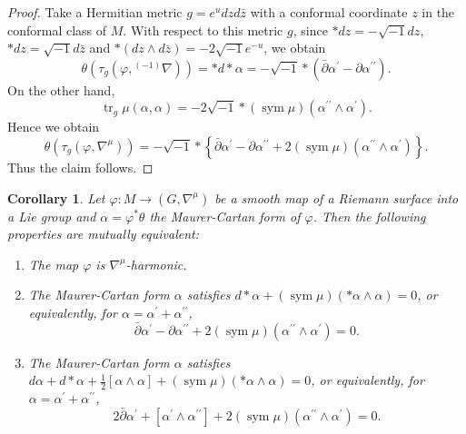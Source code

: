 \documentclass[12pt]{amsart}
\newtheorem{Corollary}[Theorem]{Corollary}
\theoremstyle{definition}
\theoremstyle{remark}
\numberwithin{equation}{section}
\begin{document}
\begin{proof}

 Take a Hermitian metric $g = e^u dz d \bar z$ with 
 a conformal coordinate $z$ in the 
 conformal class of $M$. With respect to this metric $g$, 
 since $* dz = - \sqrt{-1} dz$, $* dz = \sqrt{-1} d\bar z$ 
 and $*(d z \wedge d \bar z) = - 2 \sqrt{-1} e^{-u}$, we obtain
\begin{equation*}
\theta(\tau_{g} (\varphi,{{}^{(-1)}\nabla}))
= * d * \alpha=
-\sqrt{-1}* (\bar{\partial}\alpha^{\prime}
-\partial \alpha^{\prime\prime}).
\end{equation*}
 On the other hand, 
\begin{equation*}
{\operatorname {tr}_g} \mu(\alpha,\alpha)
=- 2\sqrt{-1}* ({\operatorname {sym}} \mu)(\alpha^{\prime \prime}
\wedge \alpha^{\prime}).
\end{equation*}
Hence we obtain
\begin{equation*}
\theta(\tau_g(\varphi,{\nabla^{\mu}}))
= -
\sqrt{-1}*
\left\{
\bar{\partial}\alpha^{\prime}-
\partial\alpha^{\prime\prime}
+2({\operatorname {sym}} \mu)(\alpha^{\prime \prime}
\wedge \alpha^{\prime})
\right\}.
\end{equation*}
Thus the claim follows.

\end{proof}

\begin{Corollary}\label{coro:affharmonic}
 Let $\varphi:M \to (G,{\nabla^{\mu}})$ be a 
 smooth map of a Riemann surface into 
 a Lie group and $\alpha = \varphi^{*}\theta$ 
 the Maurer-Cartan form of $\varphi$. 
 Then the following properties are mutually equivalent:
\begin{enumerate}
\item The map $\varphi$ is ${\nabla^{\mu}}$-harmonic.
\item The Maurer-Cartan form $\alpha$ satisfies
$ d * \alpha +({\operatorname {sym}} \mu)(*\alpha \wedge \alpha)=0$, 
or equivalently, for $\alpha =\alpha^{\prime} + \alpha^{\prime \prime}$,
\begin{equation}
\label{0-HME}
 \bar{\partial} \alpha^{\prime}- \partial\alpha^{\prime \prime} 
 + 2 ({\operatorname {sym}} \mu)(\alpha^{\prime \prime} \wedge \alpha^{\prime})=0.
\end{equation}
\item 
 The Maurer-Cartan form 
 $\alpha$ satisfies
 $d \alpha + d * \alpha +\frac{1}{2}[\alpha \wedge \alpha] + ({\operatorname {sym}} \mu)(*\alpha \wedge \alpha)=0$, or equivalently,
 for $\alpha = \alpha^{\prime} + \alpha^{\prime \prime}$,
\begin{equation}\label{0-pluri}
 2\bar{\partial} \alpha^{\prime}+
 [\alpha^{\prime}\wedge \alpha^{\prime \prime}]
 +2 ({\operatorname {sym}} \mu)(\alpha^{\prime \prime} \wedge \alpha^{\prime})=0.
\end{equation}
\end{enumerate}
\end{Corollary}
\end{document}
